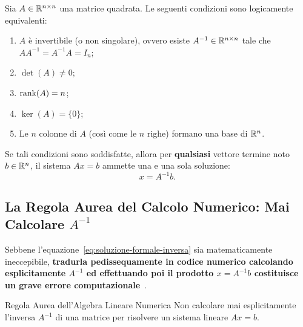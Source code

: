 \begin{theorem}
\label{thm:esistenza-unicita-quadrata}
Sia $A \in \mathbb{R}^{n \times n}$ una matrice quadrata. Le seguenti condizioni sono logicamente equivalenti:
\begin{enumerate}
    \item $A$ \`e invertibile (o non singolare), ovvero esiste $A^{-1} \in \mathbb{R}^{n \times n}$ tale che $A A^{-1} = A^{-1} A = I_n$;
    \item $\det(A) \neq 0$;
    \item $\operatorname{rank}(A) = n$;
    \item $\ker(A) = \{0\}$;
    \item Le $n$ colonne di $A$ (cos\`i come le $n$ righe) formano una base di $\mathbb{R}^n$.
\end{enumerate}
Se tali condizioni sono soddisfatte, allora per \textbf{qualsiasi} vettore termine noto $b \in \mathbb{R}^n$, il sistema $Ax = b$ ammette una e una sola soluzione:
\begin{equation}
    x = A^{-1}b.
    \label{eq:soluzione-formale-inversa}
\end{equation}
\end{theorem}

\subsection{La Regola Aurea del Calcolo Numerico: Mai Calcolare $A^{-1}$}
\label{subsec:regola-aurea}

Sebbene l'equazione~\eqref{eq:soluzione-formale-inversa} sia matematicamente ineccepibile, \textbf{tradurla pedissequamente in codice numerico calcolando esplicitamente $A^{-1}$ ed effettuando poi il prodotto $x = A^{-1}b$ costituisce un grave errore computazionale}~\cite{higham2002accuracy,trefethen1997numerical}.

\begin{alertblock}{Regola Aurea dell'Algebra Lineare Numerica}
Non calcolare mai esplicitamente l'inversa $A^{-1}$ di una matrice per risolvere un sistema lineare $Ax = b$.
\end{alertblock}

